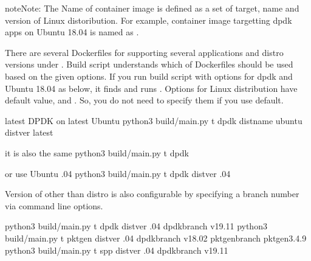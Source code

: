 \documentclass[a4paper,11pt,openany,oneside,english]{sphinxmanual}
\begin{document}
\begin{sphinxadmonition}{note}{Note:}
The Name of container image is defined as a set of target, name and
version of Linux distoribution.
For example, container image targetting dpdk apps on Ubuntu 18.04
is named as .

There are several Dockerfiles for supporting several applications and
distro versions under .
Build script understands which of Dockerfiles should be used based
on the given options.
If you run build script with options for dpdk and Ubuntu 18.04 as
below, it finds  and runs
.
Options for Linux distribution have default value,  and
. So, you do not need to specify them if you use default.

\begin{sphinxVerbatim}[commandchars=\\\{\},formatcom=\footnotesize]
 latest DPDK on latest Ubuntu
 python3 build/main.py \PYGZhy{}t dpdk \PYGZhy{}\PYGZhy{}dist\PYGZhy{}name ubuntu \PYGZhy{}\PYGZhy{}dist\PYGZhy{}ver latest

 it is also the same
 python3 build/main.py \PYGZhy{}t dpdk

 or use Ubuntu .04
 python3 build/main.py \PYGZhy{}t dpdk \PYGZhy{}\PYGZhy{}dist\PYGZhy{}ver .04
\end{sphinxVerbatim}

Version of other than distro is also configurable by specifying a branch
number via command line options.

\begin{sphinxVerbatim}[commandchars=\\\{\},formatcom=\footnotesize]
 python3 build/main.py \PYGZhy{}t dpdk \PYGZhy{}\PYGZhy{}dist\PYGZhy{}ver .04 \PYGZhy{}\PYGZhy{}dpdk\PYGZhy{}branch v19.11
 python3 build/main.py \PYGZhy{}t pktgen \PYGZhy{}\PYGZhy{}dist\PYGZhy{}ver .04 
  \PYGZhy{}\PYGZhy{}dpdk\PYGZhy{}branch v18.02 \PYGZhy{}\PYGZhy{}pktgen\PYGZhy{}branch pktgen\PYGZhy{}3.4.9
 python3 build/main.py \PYGZhy{}t spp \PYGZhy{}\PYGZhy{}dist\PYGZhy{}ver .04 \PYGZhy{}\PYGZhy{}dpdk\PYGZhy{}branch v19.11
\end{sphinxVerbatim}
\end{sphinxadmonition}
\end{document}
